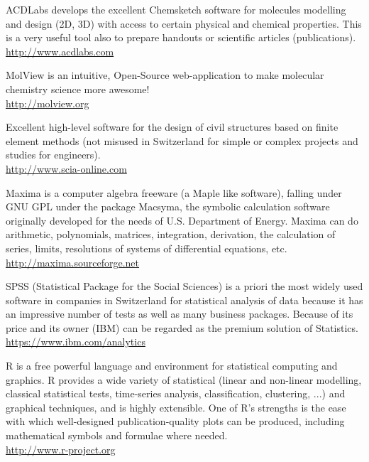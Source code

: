 	{\Large {}}{\Large {}} ACDLabs develops the excellent Chemsketch software for molecules modelling and design (2D, 3D) with access to certain physical and chemical properties. This is a very useful tool also to prepare handouts or scientific articles (publications).\\
	\href{http://www.acdlabs.com}{\color{blue}http://www.acdlabs.com}
	
	{\Large {}}{\Large {}}{\Large {}} MolView is an intuitive, Open-Source web-application to make molecular chemistry science more awesome!\\
	\href{http://molview.org}{\color{blue}http://molview.org}
	
	{\Large {}}{\Large {}} Excellent high-level software for the design of civil structures based on finite element methods (not misused in Switzerland for simple or complex projects and studies for engineers).\\
	\href{http://www.scia-online.com}{\color{blue}http://www.scia-online.com}
	
	{\Large {}}{\Large {}} Maxima is a computer algebra freeware (a Maple like software), falling under GNU GPL under the package Macsyma, the symbolic calculation software originally developed for the needs of U.S. Department of Energy. Maxima can do arithmetic, polynomials, matrices, integration, derivation, the calculation of series, limits, resolutions of systems of differential equations, etc.\\
	\href{http://maxima.sourceforge.net}{\color{blue}http://maxima.sourceforge.net}
	
	{\Large {}}{\Large {}} SPSS (Statistical Package for the Social Sciences) is a priori the most widely used software in companies in Switzerland for statistical analysis of data because it has an impressive number of tests as well as many business packages. Because of its price and its owner (IBM) can be regarded as the premium solution of Statistics.\\
	\href{https://www.ibm.com/analytics}{\color{blue}https://www.ibm.com/analytics}
	
	{\Large {}}{\Large {}}{\Large {}} R is a free powerful language and environment for statistical computing and graphics. R provides a wide variety of statistical (linear and non-linear modelling, classical statistical tests, time-series analysis, classification, clustering, ...) and graphical techniques, and is highly extensible. One of R's strengths is the ease with which well-designed publication-quality plots can be produced, including mathematical symbols and formulae where needed.\\
	\href{http://www.r-project.org}{\color{blue}http://www.r-project.org}
	

